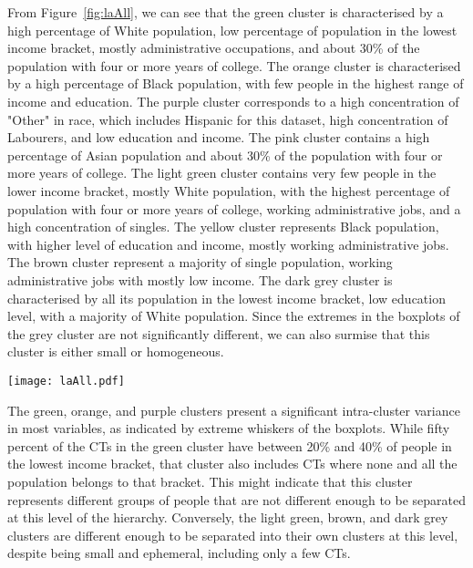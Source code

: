 From Figure~\ref{fig:laAll}, we can see that the green cluster is characterised
by a high percentage of White population, low percentage of population in the
lowest income bracket, mostly administrative occupations, and about 30\% of the
population with four or more years of college. The orange cluster is
characterised by a high percentage of Black population, with few people in the
highest range of income and education. The purple cluster corresponds to a high
concentration of "Other" in race, which includes Hispanic for this dataset, high
concentration of Labourers, and low education and income. The pink cluster
contains a high percentage of Asian population and about 30\% of the population
with four or more years of college. The light green cluster contains very few
people in the lower income bracket, mostly White population, with the highest
percentage of population with four or more years of college, working
administrative jobs, and a high concentration of singles. The yellow cluster
represents Black population, with higher level of education and income, mostly
working administrative jobs. The brown cluster represent a majority of single
population, working administrative jobs with mostly low income. The dark grey
cluster is characterised by all its population in the lowest income bracket, low
education level, with a majority of White population. Since the extremes in the
boxplots of the grey cluster are not significantly different, we can also
surmise that this cluster is either small or homogeneous.

\begin{figure*}
    \centering 
    \texttt{[image: laAll.pdf]}
    \caption{Full characterisation of the eight clusters found for LA. The red
     rectangles indicate the most relevant aspects for each
     cluster.\label{fig:laAll}}
\end{figure*}

The  green, orange, and purple clusters present a significant intra-cluster
variance in most variables, as indicated by extreme whiskers of the boxplots.
While fifty percent of the CTs in the green cluster have between 20\% and 40\%
of people in the lowest income bracket, that cluster also includes CTs where
none and all the population belongs to that bracket. This might indicate that
this cluster represents different groups of people that are not different enough
to be separated at this level of the hierarchy. Conversely, the light green,
brown, and dark grey clusters are different enough to be separated into their
own clusters at this level, despite being small and ephemeral, including only a
few CTs. 

